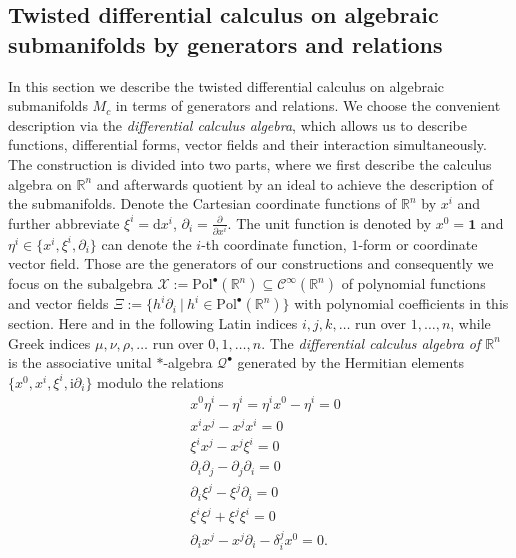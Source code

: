 \documentclass[a4paper,11pt]{article}
\begin{document}
\subsection{Twisted differential calculus on algebraic submanifolds by generators and relations}\label{TwistedDC}

In this section we describe the twisted differential calculus on algebraic submanifolds 
$M_c$ in terms of generators and relations. We choose the convenient description
via the \textit{differential calculus algebra}, which allows us to describe
functions, differential forms, vector fields and their interaction simultaneously.
The construction is divided into two parts, where we first describe the calculus
algebra on $\mathbb{R}^n$ and afterwards quotient by an ideal to achieve the
description of the submanifolds. Denote the Cartesian coordinate functions of
$\mathbb{R}^n$ by $x^i$ and further abbreviate $\xi^i=\mathrm{d}x^i$,
$\partial_i=\frac{\partial}{\partial x^i}$. The unit function is denoted by
$x^0=\mathbf{1}$ and $\eta^i\in\{x^i,\xi^i,\partial_i\}$ can denote the $i$-th
coordinate function, $1$-form or coordinate vector field.
Those are the generators of our constructions and consequently we focus on the
subalgebra $\mathcal{X}:=\mathrm{Pol}^\bullet(\mathbb{R}^n)
\subseteq\mathcal{C}^\infty(\mathbb{R}^n)$ of polynomial functions and vector fields
$\Xi:=\{h^i\partial_i~|~h^i\in\mathrm{Pol}^\bullet(\mathbb{R}^n)\}$ with polynomial
coefficients in this section.
Here and in the following Latin indices $i,j,k,\ldots$ run over $1,\ldots,n$,
while Greek indices $\mu,\nu,\rho,\ldots$ run over $0,1,\ldots,n$.
The \textit{differential calculus algebra of $\mathbb{R}^n$}  
is the associative unital $*$-algebra $\mathcal{Q}^\bullet$ generated by
the Hermitian elements $\{x^0,x^i,\xi^i,\mathrm{i}\partial_i\}$ modulo the
relations
\begin{equation}\label{eq09}
\begin{split}
    &x^0\eta^i-\eta^i=\eta^ix^0-\eta^i=0\\
    &x^ix^j-x^jx^i=0\\
    &\xi^ix^j-x^j\xi^i=0\\
    &\partial_i\partial_j-\partial_j\partial_i=0\\
    &\partial_i\xi^j-\xi^j\partial_i=0\\
    &\xi^i\xi^j+\xi^j\xi^i=0\\
    &\partial_ix^j-x^j\partial_i-\delta_i^jx^0=0.
\end{split}
\end{equation}
\end{document}

